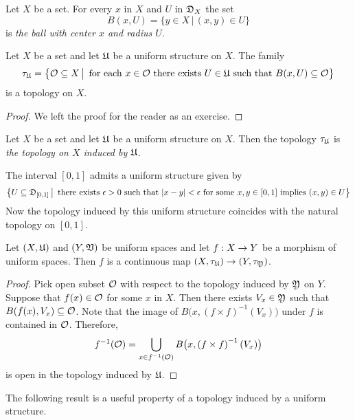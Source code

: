 \begin{definition}
Let $X$ be a set. For every $x$ in $X$ and $U$ in ${\mathfrak D}_X$ the set
$$B(x,U) = \big\{y\in X\,\big|\,(x,y)\in U\big\}$$
is \textit{the ball with center $x$ and radius $U$}.
\end{definition}

\begin{fact}\label{fact:topology_induced_by_uniform_structure}
Let $X$ be a set and let ${\mathfrak U}$ be a uniform structure on $X$. The family
$$\tau_{{\mathfrak U}} = \big\{{\mathcal O}\subseteq X\,\big|\,\mbox{ for each }x\in {\mathcal O}\mbox{ there exists }U\in {\mathfrak U}\mbox{ such that }B(x,U)\subseteq {\mathcal O}\big\}$$
is a topology on $X$.
\end{fact}
\begin{proof}
We left the proof for the reader as an exercise.
\end{proof}

\begin{definition}
Let $X$ be a set and let ${\mathfrak U}$ be a uniform structure on $X$. Then the topology $\tau_{{\mathfrak U}}$ is \textit{the topology on $X$ induced by ${\mathfrak U}$}.
\end{definition}


\begin{example}\label{example:uniform_structure_on_interval}
The interval $[0,1]$ admits a uniform structure given by
$$\big\{U\subseteq {\mathfrak D}_{[0,1]}\,\big|\,\mbox{ there exists }\epsilon > 0\mbox{ such that }|x - y| < \epsilon\mbox{ for some }x,y\in [0,1]\mbox{ implies }(x,y)\in U\big\}$$
Now the topology induced by this uniform structure coincides with the natural topology on $[0,1]$.
\end{example}

\begin{fact}\label{fact:uniform_morphism_is_a_continuous_map}
Let $(X,{\mathfrak U})$ and $(Y,{\mathfrak V})$ be uniform spaces and let $f:X\rightarrow Y$ be a morphism of uniform spaces. Then $f$ is a continuous map $\left(X,\tau_{{\mathfrak U}}\right)\rightarrow \left(Y,\tau_{{\mathfrak Y}}\right)$.
\end{fact}
\begin{proof}
Pick open subset ${\mathcal O}$ with respect to the topology induced by ${\mathfrak Y}$ on $Y$. Suppose that $f(x) \in {\mathcal O}$ for some $x$ in $X$. Then there exists $V_x \in {\mathfrak Y}$ such that $B(f(x),V_x)\subseteq {\mathcal O}$. Note that the image of $B\big(x,\left(f\times f\right)^{-1}(V_x)\big)$ under $f$ is contained in ${\mathcal O}$. Therefore,
$$f^{-1}({\mathcal O}) = \bigcup_{x\in f^{-1}({\mathcal O})}B\big(x,\left(f\times f\right)^{-1}(V_x)\big)$$
is open in the topology induced by ${\mathfrak U}$.
\end{proof}
\noindent
The following result is a useful property of a topology induced by a uniform structure. 

